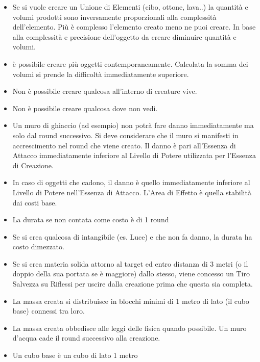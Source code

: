\documentclass[a4paper,11pt,twoside,openany]{book}
\begin{document}
\begin{itemize}
\item Se si vuole creare un Unione di Elementi (cibo, ottone, lava..) la quantità e volumi prodotti sono inversamente proporzionali alla complessità dell'elemento. Più è complesso l'elemento creato meno ne puoi creare. In base alla complessità e precisione dell'oggetto da creare diminuire quantità e volumi. 
\item è possibile creare più oggetti contemporaneamente. Calcolata la somma dei volumi si prende la difficoltà immediatamente superiore. 
\item Non è possibile creare qualcosa all'interno di creature vive. 
\item Non è possibile creare qualcosa dove non vedi. 
\item Un muro di ghiaccio (ad esempio) non potrà fare danno immediatamente ma solo dal round successivo. Si deve considerare che il muro si manifesti in accrescimento nel round che viene creato. Il danno è pari all'Essenza di Attacco immediatamente inferiore al Livello di Potere utilizzata per l'Essenza di Creazione. 
\item In caso di oggetti che cadono, il danno è quello immediatamente inferiore al Livello di Potere nell'Essenza di Attacco. L'Area di Effetto è quella stabilità dai costi base. 
\item La durata se non contata come costo è di 1 round 
\item Se si crea qualcosa di intangibile (es. Luce) e che non fa danno, la durata ha costo dimezzato. 
\item Se si crea materia solida attorno al target ed entro distanza di 3 metri (o il doppio della sua portata se è maggiore) dallo stesso, viene concesso un Tiro Salvezza su Riflessi per uscire dalla creazione prima che questa sia completa. 
\item La massa creata si distribuisce in blocchi minimi di 1 metro di lato (il cubo base) connessi tra loro. 
\item La massa creata obbedisce alle leggi delle fisica quando possibile. Un muro d'acqua cade il round successivo alla creazione. 
\item Un cubo base è un cubo di lato 1 metro 
\end{itemize}

\medskip
\end{document}
